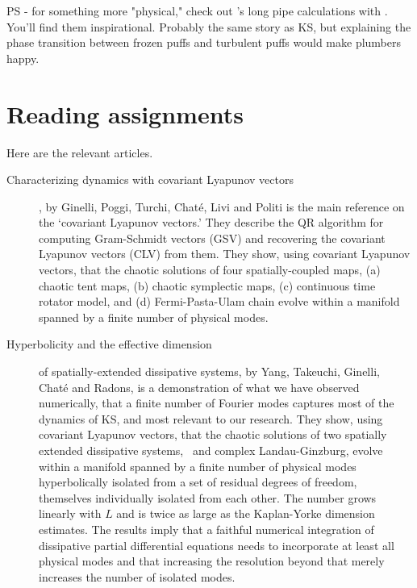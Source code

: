 PS - for something more "physical," check out
's long pipe calculations with
.
You'll find them inspirational. Probably the same story as KS, but explaining the
phase transition between frozen puffs and turbulent puffs would make plumbers happy.

\section{Reading assignments}

 Here are the relevant articles.

\begin{description}
\item[Characterizing dynamics with covariant Lyapunov
              vectors], by
Ginelli, Poggi, Turchi, Chat\'{e}, Livi and Politi
is the main reference on the
`covariant Lyapunov vectors.' They describe the QR algorithm for
computing Gram-Schmidt vectors (GSV) and recovering
the covariant Lyapunov vectors (CLV) from them.
They show, using covariant Lyapunov vectors, that
  the chaotic solutions of four spatially-coupled maps,
(a) chaotic tent maps,
(b) chaotic symplectic maps,
(c) continuous time rotator model, and
(d) Fermi-Pasta-Ulam chain
  evolve within a manifold spanned by a finite number
  of physical modes.

\item[Hyperbolicity and the effective dimension] of
    spatially-extended dissipative
    systems, by Yang, Takeuchi, Ginelli, Chat\'{e}
    and Radons,
 is a demonstration of what we
  have observed numerically, that a finite number of Fourier modes
  captures most of the dynamics of KS, and most relevant to our research.
 They show, using covariant Lyapunov vectors, that
  the chaotic solutions of two spatially extended dissipative
  systems, \KS\ and complex Landau-Ginzburg,
  evolve within a manifold spanned by a finite number
  of physical modes hyperbolically isolated from a set of
  residual degrees of freedom, themselves individually
  isolated from each other. The number grows linearly with
  $L$ and is twice as large as the Kaplan-Yorke dimension estimates.
  The results imply that a
  faithful numerical integration of dissipative
  partial differential equations needs to incorporate at
  least all physical modes and that increasing the resolution
  beyond that
  merely increases the number of isolated modes.


\end{description}
